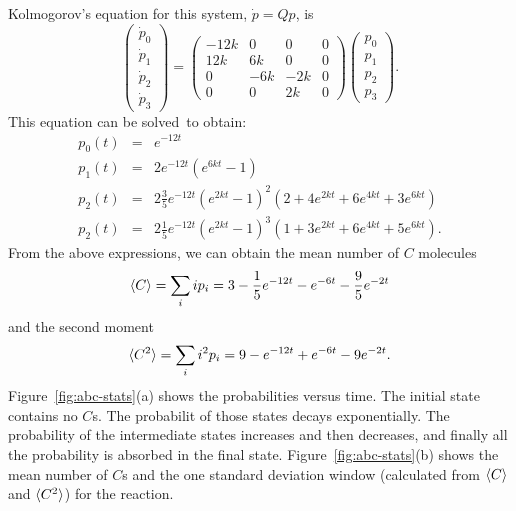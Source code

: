 \begin{example}
Kolmogorov's equation for this system, $\dot p = Q p$, is
%
$$
\left ( \begin{array}{c}
\dot p_0 \\
\dot p_1 \\
\dot p_2 \\
\dot p_3 
\end{array}
\right ) = \left (
\begin{array}{cccc}
-12 k & 0 & 0 & 0 \\
12 k & 6k & 0 & 0 \\
0 & -6k & -2k & 0 \\
0 & 0 & 2 k & 0 
\end{array}
\right  )\left ( \begin{array}{c}
p_0 \\
p_1 \\
p_2 \\
p_3 
\end{array}
\right ) .
$$
%
This equation can be solved\footnotemark \ to obtain:
%
\begin{eqnarray*}
p_0(t) & = & e^{-12 t} \\
p_1(t) & = & 2 e^{-12 t} \left ( e^{6kt} - 1 \right ) \\
p_2(t) & = & 2\frac{3}{5} e^{-12 t} \left ( e^{2kt} - 1 \right)^2 \left ( 2 + 4 e^{2kt} + 6 e^{4kt} + 3 e^{6kt}\right ) \\
p_2(t) & = & 2\frac{1}{5} e^{-12 t} \left ( e^{2kt} - 1 \right)^3 \left ( 1 + 3 e^{2kt} + 6 e^{4kt} + 5 e^{6kt}\right )  .
\end{eqnarray*}
%
From the above expressions, we can obtain the mean number of $C$ molecules
%
$$
\langle C \rangle = \sum_i i p_i = 3 - \frac{1}{5} e^{-12 t} - e^{-6 t} - \frac{9}{5} e^{-2 t}
$$
%
and the second moment
$$
\langle C^2 \rangle = \sum_i i^2 p_i = 9 - e^{-12 t} + e^{-6 t} - 9 e^{-2 t} .
$$
Figure~\ref{fig:abc-stats}(a) shows the probabilities versus time. The
initial state contains no $C$s. The probabilit of those states decays
exponentially. The probability of the intermediate states increases
and then decreases, and finally all the probability is absorbed in the
final state. Figure~\ref{fig:abc-stats}(b) shows the mean number of $C$s
and the one standard deviation window (calculated from $\langle C \rangle$ and
$\langle C^2 \rangle$) for the reaction. 
\enx
\end{example}




